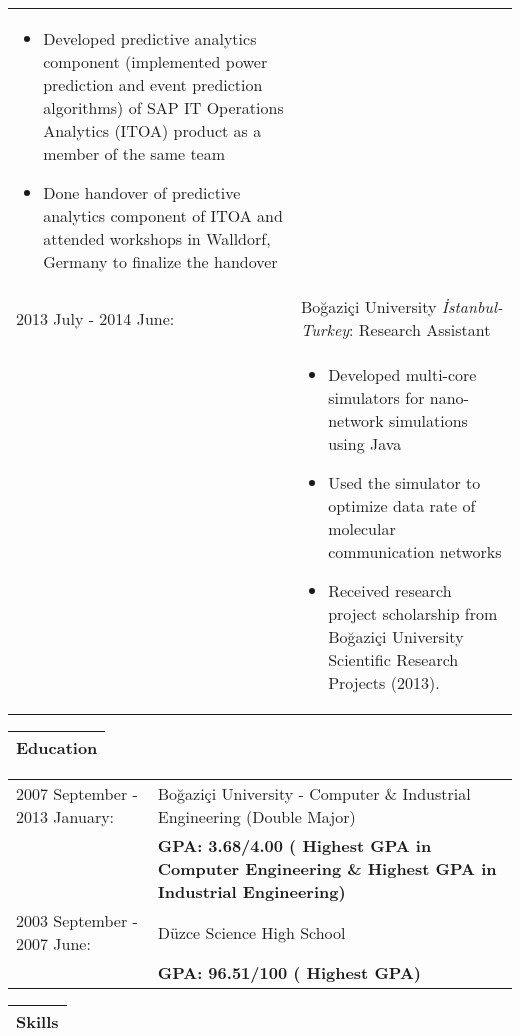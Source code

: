 \documentclass[11pt]{article}
\newcommand{\bigspace}{\vspace{0.4cm}}
\begin{document}
\begin{tabular}{p{5.5cm} p{12.5cm}}
\begin{itemize}
\item Developed predictive analytics component (implemented power prediction and event prediction algorithms) of SAP IT Operations Analytics (ITOA) product as a member of the same team
\item Done handover of predictive analytics component of ITOA and attended workshops in Walldorf, Germany to finalize the handover
\vspace{-10pt}
\end{itemize}\\
2013 July - 2014 June:       & Bo\u{g}azi\c{c}i University \textit{\.{I}stanbul-Turkey}: Research Assistant \\
							 &
\begin{itemize}
\setlength\itemsep{0em}
\vspace{-15pt}
\item Developed multi-core simulators for nano-network simulations using Java
\item Used the simulator to optimize data rate of molecular communication networks
\item Received research project scholarship from Bo\u{g}azi\c{c}i University Scientific Research Projects (2013).
\vspace{-10pt}
\end{itemize}\\
\end{tabular}

\pagebreak
\begin{tabular}{p{18cm}}
\textbf{Education} \\
\hline
\end{tabular}


\begin{tabular}{p{5.5cm} p{12.5cm}}
\\
2007 September - 2013 January:
&	Bo\u{g}azi\c{c}i University - Computer \& Industrial Engineering (Double Major)\\
&	\textbf{GPA: 3.68/4.00 (\nth{3} Highest GPA in Computer Engineering \& \nth{4} Highest GPA in Industrial Engineering)}\\


2003 September - 2007 June:
&	D\"{u}zce Science High School\\
&	\textbf{GPA: 96.51/100 (\nth{3} Highest GPA)}
\end{tabular}


\begin{tabular}{p{18cm}}
\textbf{Skills} \\
\hline
\end{tabular}
\end{document}
